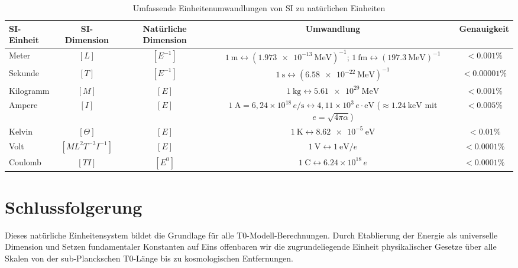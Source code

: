 	\begin{table}[htbp]
		\centering
		\begin{adjustbox}{width=0.95\textwidth}
			\begin{tabular}{lcccc}
				\toprule
				\textbf{SI-Einheit} & \textbf{SI-Dimension} & \textbf{Natürliche Dimension} & \textbf{Umwandlung} & \textbf{Genauigkeit} \\
				\midrule
				Meter & $[L]$ & $[E^{-1}]$ & $\SI{1}{\meter} \leftrightarrow (\SI{1.973e-13}{\mega\electronvolt})^{-1}$; $\SI{1}{\femto\meter} \leftrightarrow (\SI{197.3}{\mega\electronvolt})^{-1}$ & $< 0.001\%$ \\
				Sekunde & $[T]$ & $[E^{-1}]$ & $\SI{1}{\second} \leftrightarrow (\SI{6.58e-22}{\mega\electronvolt})^{-1}$ & $< 0.00001\%$ \\
				Kilogramm & $[M]$ & $[E]$ & $\SI{1}{\kilogram} \leftrightarrow \SI{5.61e29}{\mega\electronvolt}$ & $< 0.001\%$ \\
				Ampere & $[I]$ & $[E]$ & $\SI{1}{\ampere} = 6{,}24 \times 10^{18}\,e/\si{\second} \leftrightarrow 4{,}11 \times 10^{3}\,e\cdot\si{\electronvolt}$ ($\approx \SI{1.24}{\kilo\electronvolt}$ mit $e = \sqrt{4\pi\alpha}$) & $< 0.005\%$ \\
				Kelvin & $[\Theta]$ & $[E]$ & $\SI{1}{\kelvin} \leftrightarrow \SI{8.62e-5}{\electronvolt}$ & $< 0.01\%$ \\
				Volt & $[ML^2 T^{-3} I^{-1}]$ & $[E]$ & $\SI{1}{\volt} \leftrightarrow \SI{1}{\electronvolt}/e$ & $< 0.0001\%$ \\
				Coulomb & $[T I]$ & $[E^0]$ & $\SI{1}{\coulomb} \leftrightarrow 6.24 \times 10^{18} \, e$ & $< 0.0001\%$ \\
				\bottomrule
			\end{tabular}
		\end{adjustbox}
		\caption{Umfassende Einheitenumwandlungen von SI zu natürlichen Einheiten}
		\label{tab:umwandlung}
	\end{table}
	
	\section{Schlussfolgerung}
	
	Dieses natürliche Einheitensystem bildet die Grundlage für alle T0-Modell-Berechnungen. Durch Etablierung der Energie als universelle Dimension und Setzen fundamentaler Konstanten auf Eins offenbaren wir die zugrundeliegende Einheit physikalischer Gesetze über alle Skalen von der sub-Planckschen T0-Länge bis zu kosmologischen Entfernungen.
	
